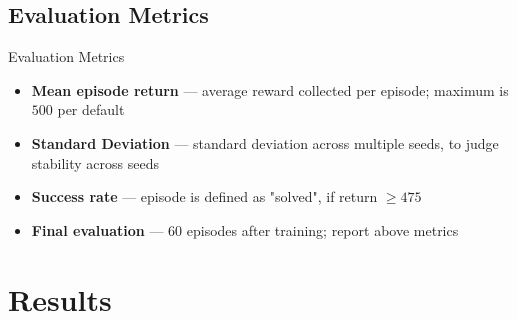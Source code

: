 \documentclass[aspectratio=169, 11pt]{beamer}
\begin{document}
\subsection{Evaluation Metrics}
\begin{frame}{Evaluation Metrics}
  \begin{itemize}
    \item \textbf{Mean episode return} --- average reward collected per episode; maximum is $500$ per default
    \item \textbf{Standard Deviation} --- standard deviation across multiple seeds, to judge stability across seeds
    \item \textbf{Success rate} --- episode is defined as "solved", if return $\geq 475$

    \item \textbf{Final evaluation} --- $60$ episodes after training; report above metrics
  \end{itemize}
\end{frame}

\section{Results}
\end{document}
